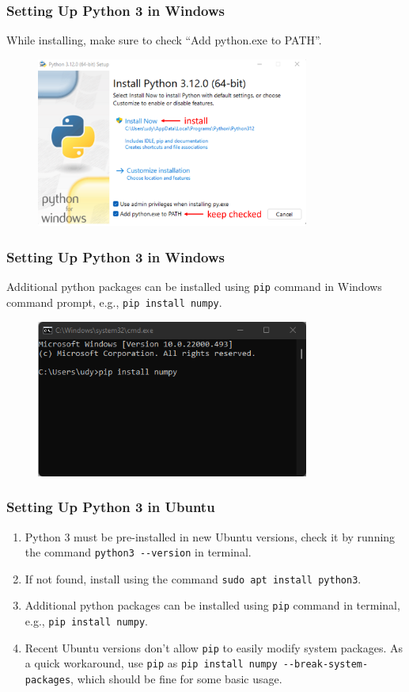 \documentclass{beamer}
\begin{document}
\begin{frame}
\frametitle{Setting Up Python 3 in Windows}
While installing, make sure to check ``Add python.exe to PATH''.
\begin{figure}[H]
\centering
\includegraphics[width=0.8\textwidth]{images/0_windows-setup.png}
\end{figure}
\end{frame}

\begin{frame}
\frametitle{Setting Up Python 3 in Windows}
Additional python packages can be installed using \lstinline{pip} command in Windows command prompt, e.g., \lstinline{pip install numpy}.
\begin{figure}[H]
\centering
\includegraphics[width=0.8\textwidth]{images/0_windows-pip.png}
\end{figure}
\end{frame}

\begin{frame}
\frametitle{Setting Up Python 3 in Ubuntu}
\begin{enumerate}
\item Python 3 must be pre-installed in new Ubuntu versions, check it by running the command \lstinline{python3 --version} in terminal.
\item If not found, install using the command \lstinline{sudo apt install python3}.
\item Additional python packages can be installed using \lstinline{pip} command in terminal, e.g., \lstinline{pip install numpy}.
\item Recent Ubuntu versions don't allow \lstinline{pip} to easily modify system packages. As a quick workaround, use \lstinline{pip} as \lstinline{pip install numpy --break-system-packages}, which should be fine for some basic usage.
\end{enumerate}
\end{frame}
\end{document}
